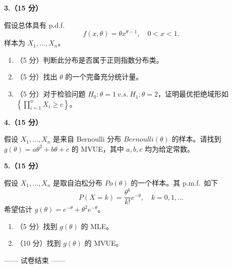 \documentclass[12pt,a4paper]{ctexart}
\newcommand{\question}[2]{\bigskip\noindent\textbf{#1}\par\nobreak\medskip}
\begin{document}
\question{3.（15 分）}{15}
假设总体具有 p.d.f.
\[ f(x,\theta)=\theta x^{\theta-1},\quad 0<x<1. \]
样本为 $X_{1},\ldots,X_{n}$。
\begin{enumerate}[label=(\arabic*),leftmargin=2.4em]
  \item （5 分）判断此分布是否属于正则指数分布类。
  \item （5 分）找出 $\theta$ 的一个完备充分统计量。
  \item （5 分）对于检验问题 $H_{0}:\theta=1\ v.s.\ H_{1}:\theta=2$，证明最优拒绝域形如 $\left\{\prod_{i=1}^{n}X_{i}\ge c\right\}$。
\end{enumerate}

\question{4.（15 分）}{15}
假设 $X_{1},\ldots,X_{n}$ 是来自 Bernoulli 分布 $Bernoulli(\theta)$ 的样本。请找到 $g(\theta)=a\theta^{2}+b\theta+c$ 的 MVUE，其中 $a,b,c$ 均为给定常数。

\question{5.（15 分）}{15}
假设 $X_{1},\ldots,X_{n}$ 是取自泊松分布 $Po(\theta)$ 的一个样本。其 p.m.f.\ 如下
\[ P(X=k)=\frac{\theta^{k}}{k!}e^{-\theta},\quad k=0,1,\ldots \]
希望估计 $g(\theta)=e^{-\theta}+\theta^{2}e^{-\theta}$。
\begin{enumerate}[label=(\arabic*),leftmargin=2.4em]
  \item （5 分）找到 $g(\theta)$ 的 MLE。
  \item （10 分）找到 $g(\theta)$ 的 MVUE。
\end{enumerate}

\vfill
\begin{center}\small —— 试卷结束 ——\end{center}
\end{document}
